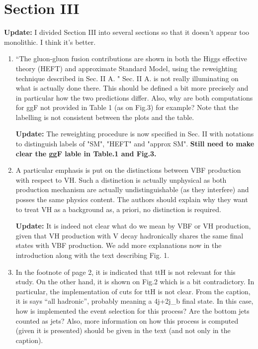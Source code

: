 \documentclass[12pt]{article}
\begin{document}
\section*{Section III}
{\bf Update:} I divided Section III into several sections so that it doesn't appear too monolithic. I think it's better. 
\begin{enumerate}
\item ``The gluon-gluon fusion contributions are shown in both the Higgs effective theory (HEFT) and approximate Standard Model, using the reweighting technique described in Sec. II A. " Sec. II A. is not really illuminating on what is actually done there. This should be defined a bit more precisely and in particular how the two predictions differ. Also, why are both computations for ggF not provided in Table 1 (as on Fig.3) for example? Note that the labelling is not consistent between the plots and the table.

{\bf Update:} The reweighting procedure is now specified in Sec. II with notations to distinguish labels of "SM", "HEFT" and "approx SM". {\bf Still need to make clear the ggF lable in Table.1 and Fig.3.}

\item A particular emphasis is put on the distinctions between VBF production with respect to VH. Such a distinction is actually unphysical as both production mechanism are actually undistinguishable (as they interfere) and posses the same physics content. The authors should explain why they want to treat VH as a background as, a priori, no distinction is required.

{\bf Update:} It is indeed not clear what do we mean by VBF or VH production, given that VH production with V decay hadronically shares the same final states with VBF production. We add more explanations now in the introduction along with the text describing Fig. 1.

\item In the footnote of page 2, it is indicated that ttH is not relevant for this study. On the other hand, it is shown on Fig.2 which is a bit contradictory. In particular, the implementation of cuts for ttH is not clear. From the caption, it is says “all hadronic”, probably meaning a 4j+2j\_b final state. In this case, how is implemented the event selection for this process? Are the bottom jets counted as jets? Also, more information on how this process is computed (given it is presented) should be given in the text (and not only in the caption).


\end{enumerate}
\end{document}
